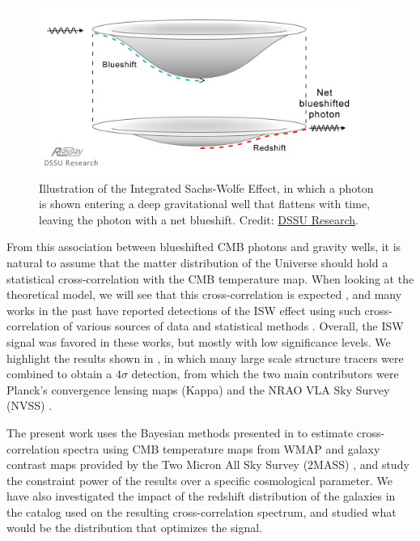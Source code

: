 \documentclass[openany,a4paper,12pt,oneside]{book}
\begin{document}
\begin{spacing}{1.5}
\begin{figure}[!htb]
	\centering
	\includegraphics[width=.7\linewidth]{Imagens/ISW_illustration.png}
	\caption{Illustration of the Integrated Sachs-Wolfe Effect, in which a photon is shown entering a deep gravitational well that flattens with time, leaving the photon with a net blueshift. Credit: \href{http://www.cellularuniverse.org/SachsWolfe-Disproof(ijass)-Ranzan.pdf}{DSSU Research}.}	
	\label{fig:ISW_illustration}
\end{figure}


From this association between blueshifted CMB photons and gravity wells, it is natural to assume that the matter distribution of the Universe should hold a statistical cross-correlation with the CMB temperature map. When looking at the theoretical model, we will see that this cross-correlation is expected \cite{ISW_detect_Crittenden1996, ISW_detect_Cooray2002}, and many works in the past have reported detections of the ISW effect using such cross-correlation of various sources of data and statistical methods \cite{ISW_detect_Boughn2004, ISW_detect_Nolta2004, ISW_detect_Gaztanga2006, ISW_detect_and_review2011}. Overall, the ISW signal was favored in these works, but mostly with low significance levels. We highlight the results shown in \cite{cross_corr:Planck}, in which many large scale structure tracers were combined to obtain a $4\sigma$ detection, from which the two main contributors were Planck's convergence lensing maps (Kappa) and the NRAO VLA Sky Survey (NVSS) \cite{NVSS}.

The present work uses the Bayesian methods presented in \cite{Moura-Santos_2016} to estimate cross-correlation spectra using CMB temperature maps from WMAP \cite{WMAP_results,WMAP_data} and galaxy contrast maps provided by the Two Micron All Sky Survey (2MASS) \cite{2MASS}, and study the constraint power of the results over a specific cosmological parameter. We have also investigated the impact of the redshift distribution of the galaxies in the catalog used on the resulting cross-correlation spectrum, and studied what would be the distribution that optimizes the signal.  


\end{spacing}
\end{document}

